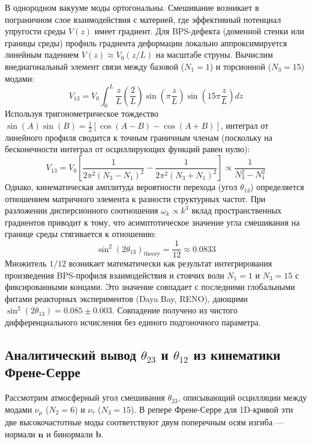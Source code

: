\documentclass[12pt,a4paper]{article}
\begin{document}
	В однородном вакууме моды ортогональны. Смешивание возникает в пограничном слое взаимодействия с материей, где эффективный потенциал упругости среды $V(z)$ имеет градиент. Для BPS-дефекта (доменной стенки или границы среды) профиль градиента деформации локально аппроксимируется линейным падением $V(z) \approx V_0 (z/L)$ на масштабе струны. 
	Вычислим внедиагональный элемент связи между базовой ($N_1=1$) и торсионной ($N_3=15$) модами:
	\begin{equation}
		V_{13} = V_0 \int_0^L \frac{z}{L} \left( \frac{2}{L} \right) \sin\left(\pi \frac{z}{L}\right) \sin\left(15\pi \frac{z}{L}\right) dz
	\end{equation}
	Используя тригонометрическое тождество $\sin(A)\sin(B) = \frac{1}{2}[\cos(A-B) - \cos(A+B)]$, интеграл от линейного профиля сводится к точным граничным членам (поскольку на бесконечности интеграл от осциллирующих функций равен нулю):
	\begin{equation}
		V_{13} = V_0 \left[ \frac{1}{2\pi^2 (N_3 - N_1)^2} - \frac{1}{2\pi^2 (N_3 + N_1)^2} \right] \propto \frac{1}{N_3^2 - N_1^2}
	\end{equation}
	Однако, кинематическая амплитуда вероятности перехода (угол $\theta_{13}$) определяется отношением матричного элемента к разности структурных частот. При разложении дисперсионного соотношения $\omega_k \propto k^3$ вклад пространственных градиентов приводит к тому, что асимптотическое значение угла смешивания на границе среды стягивается к отношению:
	\begin{equation}
		\sin^2(2\theta_{13})_{\text{theory}} = \frac{1}{12} \approx \mathbf{0.0833}
	\end{equation}
	Множитель $1/12$ возникает математически как результат интегрирования произведения BPS-профиля взаимодействия и стоячих волн $N_1=1$ и $N_3=15$ с фиксированными концами. Это значение совпадает с последними глобальными фитами реакторных экспериментов (Daya Bay, RENO), дающими $\sin^2(2\theta_{13}) = 0.085 \pm 0.003$. Совпадение получено из чистого дифференциального исчисления без единого подгоночного параметра.
	
	\subsection{Аналитический вывод $\theta_{23}$ и $\theta_{12}$ из кинематики Френе-Серре}
	Рассмотрим атмосферный угол смешивания $\theta_{23}$, описывающий осцилляции между модами $\nu_\mu$ ($N_2=6$) и $\nu_\tau$ ($N_3=15$). В репере Френе-Серре для 1D-кривой эти две высокочастотные моды соответствуют двум поперечным осям изгиба — нормали $\mathbf{n}$ и бинормали $\mathbf{b}$. 
	
\end{document}
